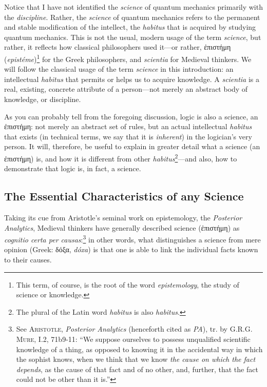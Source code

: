 \documentclass[article,12pt,a4paper,oneside]{memoir}
\begin{document}
    Notice that I have not identified the \emph{science} of quantum
    mechanics primarily with the \emph{discipline}. Rather, the
    \emph{science} of quantum mechanics refers to the permanent and
    stable modification of the intellect, the \emph{habitus} that is
    acquired by studying quantum mechanics. This is not the usual,
    modern usage of the term \emph{science}, but rather, it reflects how
    classical philosophers used it---or rather, ἐπιστήμη
    (\emph{epistéme})\footnote{This term, of course, is the root of the
      word \emph{epistemology}, the study of science or knowledge.} for
    the Greek philosophers, and \emph{scientia} for Medieval thinkers.
    We will follow the classical usage of the term \emph{science} in
    this introduction: an intellectual \emph{habitus} that permits or
    helps us to acquire knowledge. A \emph{scientia} is a real,
    existing, concrete attribute of a person---not merely an abstract
    body of knowledge, or discipline.

    As you can probably tell from the foregoing discussion, logic is
    also a science, an ἐπιστήμη: not merely an abstract set of rules,
    but an actual intellectual \emph{habitus} that exists (in technical
    terms, we say that it is \emph{inherent}) in the logician's very
    person. It will, therefore, be useful to explain in greater detail
    what a science (an ἐπιστήμη) is, and how it is different from other
    \emph{habitus}\footnote{The plural of the Latin word \emph{habitus}
      is also \emph{habitus}.}---and also, how to demonstrate that logic
    is, in fact, a science.

    \hypertarget{the-essential-characteristics-of-any-science}{%
    \subsection{The Essential Characteristics of any
    Science}\label{the-essential-characteristics-of-any-science}}

    Taking its cue from Aristotle's seminal work on epistemology, the
    \emph{Posterior Analytics}, Medieval thinkers have generally
    described science (ἐπιστήμη) as \emph{cognitio certa per
    causas}:\footnote{See \textsc{Aristotle}, \emph{Posterior Analytics}
      (henceforth cited as \emph{PA}), tr. by \textsc{G.R.G. Mure}, I.2,
      71b9-11: ``We suppose ourselves to possess unqualified scientific
      knowledge of a thing, as opposed to knowing it in the accidental
      way in which the sophist knows, when we think that we know
      \emph{the cause on which the fact depends}, as the cause of that
      fact and of no other, and, further, that the fact could not be
      other than it is.''} in other words, what distinguishes a science
    from mere opinion (Greek: δόξα, \emph{dóxa}) is that one is able to
    link the individual facts known to their causes.
\end{document}
